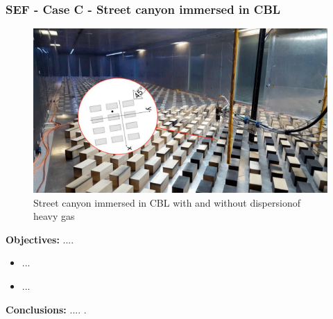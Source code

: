 \subsubsection{SEF - Case C - Street canyon immersed in CBL}
    \begin{figure}[h!]
        \hypertarget{link:sef_A}{}
        \centering
        \includegraphics[scale=0.7]{imgs/sef_dataset_image.png}
        \caption{Street canyon immersed in CBL with and without dispersionof heavy gas}
    \end{figure}
    \textbf{Objectives:} ....\newline
    \begin{itemize}
    \item ...
    \item ...
    \end{itemize}
    \textbf{Conclusions:} .... .\newline

